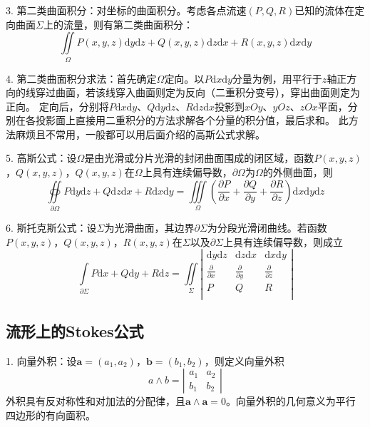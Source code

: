 3. 第二类曲面积分：对坐标的曲面积分。考虑各点流速$\left(P,Q,R\right)$已知的流体在定向曲面$\Sigma$上的流量，则有第二类曲面积分：
\begin{equation*}
    \iint\limits_{\Omega}P(x,y,z) \mathrm{d}y\mathrm{d}z+Q(x,y,z) \mathrm{d}z\mathrm{d}x+R(x,y,z) \mathrm{d}x\mathrm{d}y
\end{equation*}

4. 第二类曲面积分求法：首先确定$\Omega$定向。以$P\mathrm{d}x\mathrm{d}y$分量为例，用平行于$z$轴正方向的线穿过曲面，若该线穿入曲面则定为反向（二重积分变号），穿出曲面则定为正向。
定向后，分别将$P\mathrm{d}x\mathrm{d}y$、$Q\mathrm{d}y\mathrm{d}z$、$R\mathrm{d}z\mathrm{d}x$投影到$xOy$、$yOz$、$zOx$平面，分别在各投影面上直接用二重积分的方法求解各个分量的积分值，最后求和。
此方法麻烦且不常用，一般都可以用后面介绍的高斯公式求解。

5. 高斯公式：设$\Omega$是由光滑或分片光滑的封闭曲面围成的闭区域，函数$P(x,y,z)$，$Q(x,y,z)$，$Q(x,y,z)$在$\Omega$上具有连续偏导数，$\partial \Omega$为$\Omega$的外侧曲面，则
\begin{equation*}
    \oiint\limits_{\partial \Omega}P\mathrm{d}y\mathrm{d}z+Q\mathrm{d}z\mathrm{d}x+R\mathrm{d}x\mathrm{d}y=\iiint\limits_\Omega \left(\frac{\partial P}{\partial x}+\frac{\partial Q}{\partial y}+\frac{\partial R}{\partial z}\right)\mathrm{d}x\mathrm{d}y\mathrm{d}z
\end{equation*}

6. 斯托克斯公式：设$\Sigma$为光滑曲面，其边界$\partial \Sigma$为分段光滑闭曲线。若函数$P(x,y,z)$，$Q(x,y,z)$，$R(x,y,z)$在$\Sigma$以及$\partial \Sigma$上具有连续偏导数，则成立
\begin{equation*}
    \int\limits_{\partial \Sigma} P\mathrm{d}x+Q\mathrm{d}y+R\mathrm{d}z=\iint\limits_\Sigma \left|\begin{matrix}
        \mathrm{d}y\mathrm{d}z &\mathrm{d}z\mathrm{d}x&\mathrm{d}x\mathrm{d}y\\
        \frac{\partial }{\partial x}&\frac{\partial }{\partial y}&\frac{\partial }{\partial z}\\
        P&Q&R\\
    \end{matrix}\right|
\end{equation*}

\subsection{流形上的Stokes公式}

1. 向量外积：设$\mathbf{a}=(a_1,a_2)$，$\mathbf{b}=(b_1,b_2)$，则定义向量外积
\begin{equation*}
    a \wedge b = \left|\begin{matrix}
        a_1&a_2\\
        b_1&b_2
    \end{matrix}\right|
\end{equation*}
外积具有反对称性和对加法的分配律，且$\mathbf{a}\wedge \mathbf{a}=0$。向量外积的几何意义为平行四边形的有向面积。

